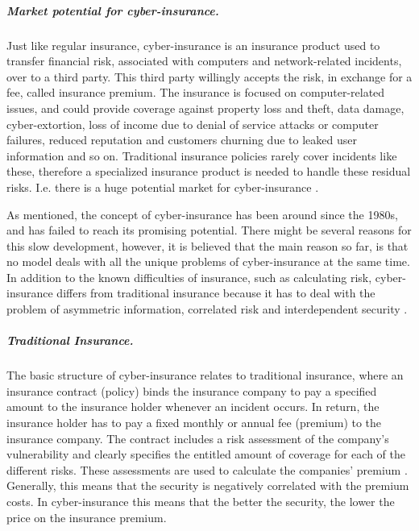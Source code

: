 \subparagraph{Market potential for cyber-insurance.}
Just like regular insurance, cyber-insurance is an insurance product used to transfer financial risk, associated with computers and network-related incidents, over to a third party. This third party willingly accepts the risk, in exchange for a fee, called insurance premium.
The insurance is focused on computer-related issues, and could provide coverage against property loss and theft, data damage, cyber-extortion, loss of income due to denial of service attacks or computer failures, reduced reputation and customers churning due to leaked user information and so on. Traditional insurance policies rarely cover incidents like these, therefore a specialized insurance product is needed to handle these residual risks. I.e. there is a huge potential market for cyber-insurance \cite{washingtonpaper}.  


As mentioned, the concept of cyber-insurance has been around since the 1980s, and has failed to reach its promising potential. There might be several reasons for this slow development, however, it is believed that the main reason so far, is that no model deals with all the unique problems of cyber-insurance at the same time. In addition to the known difficulties of insurance, such as calculating risk, cyber-insurance differs from traditional insurance because it has to deal with the problem of asymmetric information, correlated risk and interdependent security \cite{networkgames}.  

\subparagraph{Traditional Insurance.} 
The basic structure of cyber-insurance relates to traditional insurance, where an insurance contract (policy) binds the insurance company to pay a specified amount to the insurance holder whenever an incident occurs. In return, the insurance holder has to pay a fixed monthly or annual fee (premium) to the insurance company. The contract includes a risk assessment of the company's vulnerability and clearly specifies the entitled amount of coverage for each of the different risks. These assessments are used to calculate the companies' premium \cite{robinson2012incentives}. Generally, this means that the security is negatively correlated with the premium costs. In cyber-insurance this means that the better the security, the lower the price on the insurance premium.
   
